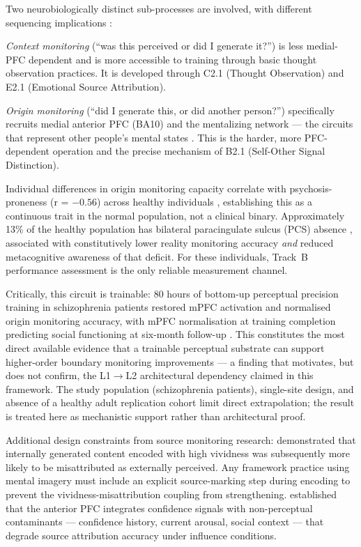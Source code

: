 \documentclass[12pt, a4paper]{article}
\begin{document}
Two neurobiologically distinct sub-processes are involved, with different sequencing
implications \citep{simons2008}:

\emph{Context monitoring} (``was this perceived or did I generate it?'') is less
medial-PFC dependent and is more accessible to training through basic thought
observation practices. It is developed through C2.1 (Thought Observation) and E2.1
(Emotional Source Attribution).

\emph{Origin monitoring} (``did I generate this, or did another person?'') specifically
recruits medial anterior PFC (BA10) and the mentalizing network --- the circuits
that represent other people's mental states \citep{simons2008, lagioia2011}. This
is the harder, more PFC-dependent operation and the precise mechanism of B2.1
(Self-Other Signal Distinction).

Individual differences in origin monitoring capacity correlate with psychosis-proneness
(r = $-0.56$) across healthy individuals \citep{simons2008}, establishing this as a
continuous trait in the normal population, not a clinical binary. Approximately 13\%
of the healthy population has bilateral paracingulate sulcus (PCS) absence
\citep{buda2011}, associated with constitutively lower reality monitoring accuracy
\emph{and} reduced metacognitive awareness of that deficit. For these individuals,
Track~B performance assessment is the only reliable measurement channel.

Critically, this circuit is trainable: 80 hours of bottom-up perceptual precision
training in schizophrenia patients restored mPFC activation and normalised origin
monitoring accuracy, with mPFC normalisation at training completion predicting
social functioning at six-month follow-up \citep{subramaniam2012}. This constitutes
the most direct available evidence that a trainable perceptual substrate can support
higher-order boundary monitoring improvements --- a finding that motivates, but does not
confirm, the L1$\to$L2 architectural dependency claimed in this framework. The study
population (schizophrenia patients), single-site design, and absence of a healthy
adult replication cohort limit direct extrapolation; the result is treated here as
mechanistic support rather than architectural proof.

Additional design constraints from source monitoring research: \citet{moseley2018}
demonstrated that internally generated content encoded with high vividness was
subsequently more likely to be misattributed as externally perceived. Any framework
practice using mental imagery must include an explicit source-marking step during
encoding to prevent the vividness-misattribution coupling from strengthening.
\citet{bangfleming2018} established that the anterior PFC integrates confidence
signals with non-perceptual contaminants --- confidence history, current arousal,
social context --- that degrade source attribution accuracy under influence conditions.
\end{document}

